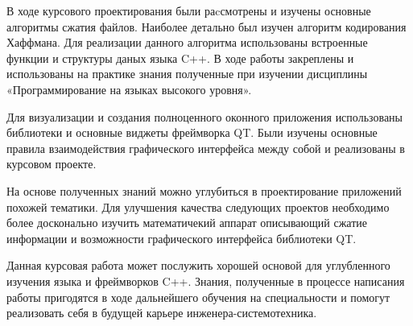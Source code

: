 \label{sec:outro}

В ходе курсового проектирования были раcсмотрены и изучены основные алгоритмы сжатия файлов.
Наиболее детально был изучен алгоритм кодирования Хаффмана.
Для реализации данного алгоритма использованы встроенные функции и структуры даных языка C++.
В ходе работы закреплены и использованы на практике знания полученные при изучении дисциплины «Программирование на языках высокого уровня».



Для визуализации и создания полноценного оконного приложения использованы библиотеки и основные виджеты фреймворка QT.
Были изучены основные правила взаимодействия графического интерфейса между собой и реализованы в курсовом проекте.



На основе полученных знаний можно углубиться в проектирование приложений похожей тематики.
Для улучшения качества следующих проектов необходимо более досконально изучить математичекий аппарат описывающий сжатие информации и возможности графического интерфейса библиотеки QT.



Данная курсовая работа может послужить хорошей основой для углубленного изучения языка и фреймворков C++.
Знания, полученные в процессе написания работы пригодятся в ходе дальнейшего обучения на специальности и помогут реализовать себя в будущей карьере инженера-системотехника.